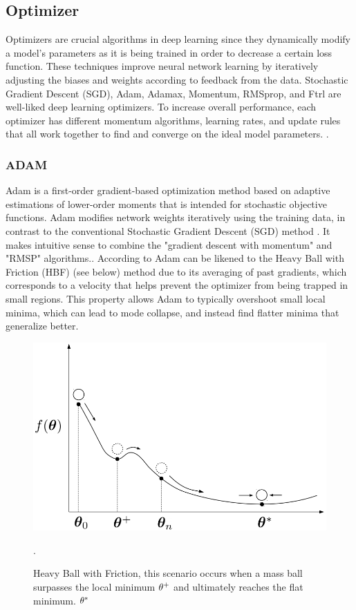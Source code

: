 \documentclass{ieeeojies}
\begin{document}
\subsection{Optimizer}
Optimizers are crucial algorithms in deep learning since they dynamically modify a model's parameters as it is being trained in order to decrease a certain loss function. These techniques improve neural network learning by iteratively adjusting the biases and weights according to feedback from the data. Stochastic Gradient Descent (SGD), Adam, Adamax, Momentum, RMSprop, and Ftrl are well-liked deep learning optimizers. To increase overall performance, each optimizer has different momentum algorithms, learning rates, and update rules that all work together to find and converge on the ideal model parameters. \cite{opti}.
\subsubsection{ADAM}
Adam is a first-order gradient-based optimization method based on adaptive estimations of lower-order moments that is intended for stochastic objective functions. Adam modifies network weights iteratively using the training data, in contrast to the conventional Stochastic Gradient Descent (SGD) method \cite{Adam_1}. It makes intuitive sense to combine the "gradient descent with momentum" and "RMSP" algorithms.\cite{Adam_2}.
According to \cite{Adam_3} Adam can be likened to the Heavy Ball with Friction (HBF) (see below) method due to its averaging of past gradients, which corresponds to a velocity that helps prevent the optimizer from being trapped in small regions. This property allows Adam to typically overshoot small local minima, which can lead to mode collapse, and instead find flatter minima that generalize better.
\begin{figure}[H]
  \centering
  \begin{minipage}{0.7\linewidth}
    \centering
    \includegraphics[width=\linewidth]{image/Adam1.png}
    \label{fig8}
  \end{minipage}
\caption{Heavy Ball with Friction, this scenario occurs when a mass ball surpasses the local minimum $\theta\sp{+}$ and ultimately reaches the flat minimum. $\theta\sp{*}$ }.
\end{figure}
\end{document}
